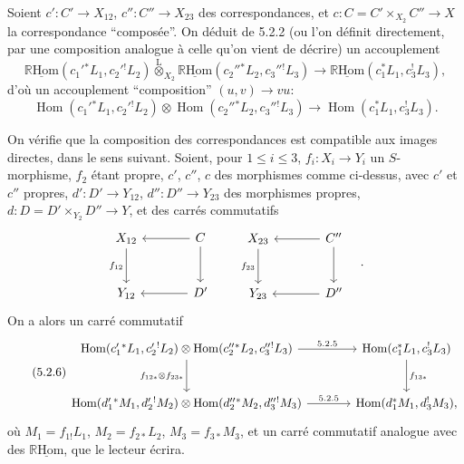\documentclass[11pt]{article}
\DeclareMathOperator{\Hom}{Hom}
\newcommand{\R}{\mathbb{R}}\newcommand{\RHomCore}{\mathbb{R}\mathrm{Hom}}
\providecommand{\RHom}{\RHomCore}
\providecommand{\uRHom}{\underline{\RHom}}
\providecommand{\RHom}{\RHomCore}
\providecommand{\Hom}{\operatorname{Hom}}
\providecommand{\RHom}{\R\mathcal{H}om}
\providecommand{\R}{\mathrm R}
\providecommand{\RHom}{\RHomCore}
\providecommand{\Hom}{\operatorname{Hom}}
\begin{document}
Soient $c':C'\to X_{12}$, $c'':C''\to X_{23}$ des correspondances, et $c:C=C'\times_{X_2}C''\to X$ la correspondance ``composée''. On déduit de 5.2.2 (ou l'on définit directement, par une composition analogue à celle qu'on vient de décrire) un accouplement
\begin{equation}
\tag{5.2.4}
\uRHom(c_1'{}^*L_1,c_2'{}^!L_2)\overset{\mathrm{L}}{\otimes}_{X_2}\uRHom(c_2''{}^*L_2,c_3''{}^!L_3)
\longrightarrow\uRHom(c_1^*L_1,c_3^!L_3),
\end{equation}
d'où un accouplement ``composition'' $(u,v)\longrightarrow vu$:
\begin{equation}
\tag{5.2.5}
\Hom(c_1'{}^*L_1,c_2'{}^!L_2)\otimes\Hom(c_2''{}^*L_2,c_3''{}^!L_3)
\longrightarrow\Hom(c_1^*L_1,c_3^!L_3).
\end{equation}

On vérifie que la composition des correspondances est compatible aux images directes, dans le sens suivant. Soient, pour $1\leq i\leq 3$, $f_i:X_i\to Y_i$ un $S$-morphisme, $f_2$ étant propre, $c'$, $c''$, $c$ des morphismes comme ci-dessus, avec $c'$ et $c''$ propres, $d':D'\to Y_{12}$, $d'':D''\to Y_{23}$ des morphismes propres, $d:D=D'\times_{Y_2}D''\to Y$, et des carrés commutatifs
\[
\begin{tikzcd}[column sep=large,row sep=large]
X_{12} \arrow[d,"f_{12}"'] & C \arrow[l] \arrow[d] \\
Y_{12} & D' \arrow[l]
\end{tikzcd}
\qquad
\begin{tikzcd}[column sep=large,row sep=large]
X_{23} \arrow[d,"f_{23}"'] & C'' \arrow[l] \arrow[d] \\
Y_{23} & D'' \arrow[l]
\end{tikzcd}\quad .
\]
On a
alors un carré commutatif
\begin{equation}
\tag{5.2.6}
\begin{tikzcd}[column sep=large,row sep=large]
\Hom(c_1'{}^*L_1,c_2'{}^!L_2)\otimes\Hom(c_2''{}^*L_2,c_3''{}^!L_3) \arrow[r,"5.2.5"] \arrow[d,"f_{12*}\otimes f_{23*}"']
& \Hom(c_1^*L_1,c_3^!L_3) \arrow[d,"f_{13*}"] \\
\Hom(d_1'{}^*M_1,d_2'{}^!M_2)\otimes\Hom(d_2''{}^*M_2,d_3''{}^!M_3) \arrow[r,"5.2.5"]
& \Hom(d_1^*M_1,d_3^!M_3),
\end{tikzcd}
\end{equation}
où $M_1=f_{1!}L_1$, $M_2=f_{2*}L_2$, $M_3=f_{3*}M_3$, et un carré commutatif analogue avec des $\uRHom$, que le lecteur écrira.
\end{document}
